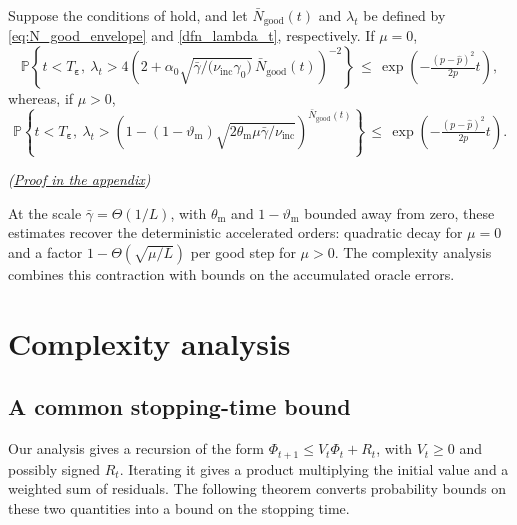 \documentclass{article}
\begin{document}
\begin{lemma}
\label{lem:good_step_contraction}
Suppose the conditions of  hold, and let
\(\bar N_{\mathrm{good}}(t)\) and \(\lambda_t\) be defined by
\eqref{eq:N_good_envelope} and \eqref{dfn_lambda_t}, respectively. If
\(\mu=0\),
\begin{equation}\label{pro_lambda_t_rate_mu=0}
\mathbb P\left\{
t<T_{\boldsymbol\varepsilon},\
\lambda_t>
4\left(
2+
\alpha_0
\sqrt{{\bar\gamma}/(
{\nu_{\mathrm{inc}}\gamma_0)}}\,
\bar N_{\mathrm{good}}(t)
\right)^{-2}
\right\}
\,\le\,
\exp\left(
-\tfrac{(p-\hat p)^2}{2p}t
\right),
\end{equation}
whereas, if \(\mu>0\),
\begingroup{}
\begin{equation}\label{pro_lambda_t_rate_mu>0}
\mathbb P\left\{
t<T_{\boldsymbol\varepsilon},\
\lambda_t>
\left(
1-(1-\vartheta_{\mathrm{m}})
\sqrt{
{2\theta_{\mathrm{m}}\mu\bar\gamma}/
{\nu_{\mathrm{inc}}}
}
\right)^{\bar N_{\mathrm{good}}(t)}
\right\}
\,\le\,
\exp\left(
-\tfrac{(p-\hat p)^2}{2p}t
\right).
\end{equation}
\par\nobreak\hfill\textnormal{\small\itshape(\hyperref[proof:good_step_contraction]{Proof in the appendix})}\par
\endgroup
\end{lemma}

At the scale $\bar\gamma=\Theta(1/L)$, with $\theta_{\mathrm m}$ and $1-\vartheta_{\mathrm m}$ bounded away from zero, these estimates recover the deterministic accelerated orders: quadratic decay for $\mu=0$ and a factor $1-\Theta(\sqrt{\mu/L})$ per good step for $\mu>0$. The complexity analysis combines this contraction with bounds on the accumulated oracle errors.
\section{Complexity analysis}\label{SECTION_3}
\subsection{A common stopping-time bound}
\label{subsec:frame}
Our analysis gives a recursion of the form
\(\Phi_{t+1}\leq V_t\Phi_t+R_t\), with \(V_t\geq0\)
and possibly signed \(R_t\).
Iterating it gives a product multiplying the initial value
and a weighted sum of residuals. The following theorem converts
probability bounds on these two quantities into a bound on
the stopping time.
\end{document}
